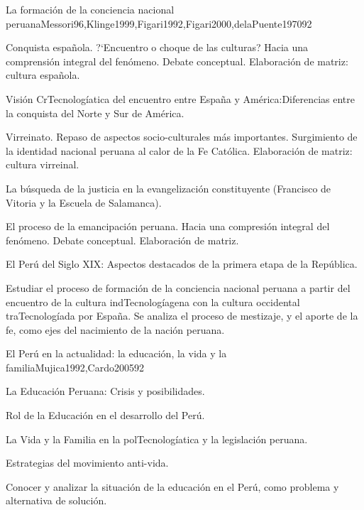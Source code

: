 \begin{syllabus}
\begin{unit}{La formación de la conciencia nacional peruana}{Messori96,Klinge1999,Figari1992,Figari2000,delaPuente1970}{9}{2}
\begin{topics}
      \item Conquista española. ?`Encuentro o choque de las culturas? Hacia una comprensión integral del fenómeno. Debate conceptual. Elaboración de matriz: cultura española.
      \item Visión CrTecnologíatica del encuentro entre España y América:Diferencias entre la conquista del Norte y Sur de América.
      \item Virreinato. Repaso de aspectos socio-culturales más importantes. Surgimiento de la identidad nacional peruana al calor de la Fe Católica. Elaboración de matriz: cultura virreinal.
      \item La búsqueda de la justicia en la evangelización constituyente (Francisco de Vitoria y la Escuela de Salamanca).
      \item El proceso de la emancipación peruana. Hacia una compresión integral del fenómeno. Debate conceptual. Elaboración de matriz.
      \item El Perú del Siglo XIX: Aspectos destacados de la primera etapa de la República.
\end{topics}
\begin{unitgoals}
      \item Estudiar el proceso de formación de la conciencia nacional peruana a partir del encuentro de la cultura indTecnologíagena con la cultura occidental traTecnologíada por España. Se analiza el proceso de mestizaje, y el aporte de la fe, como ejes del nacimiento de la nación peruana.
\end{unitgoals}
\end{unit}

\begin{unit}{El Perú en la actualidad: la educación, la vida y la familia}{Mujica1992,Cardo2005}{9}{2}
\begin{topics}
      \item La Educación Peruana: Crisis y posibilidades.
      \item Rol de la Educación en el desarrollo del Perú.
      \item La Vida y la Familia en la polTecnologíatica y la legislación peruana.
      \item Estrategias del movimiento anti-vida.
\end{topics}
\begin{unitgoals}
      \item Conocer y analizar la situación de la educación en el Perú, como problema y alternativa de solución.
\end{unitgoals}
\end{unit}


\end{syllabus}
